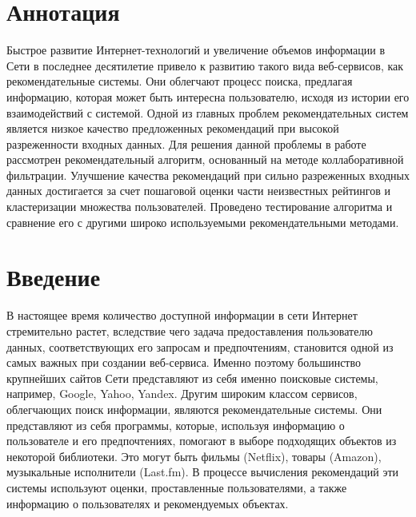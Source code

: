 \documentclass[a4paper, 12pt]{article} %
\begin{document}


\tableofcontents

\newpage
\section{Аннотация}
Быстрое развитие Интернет-технологий и увеличение объемов информации в Сети в последнее десятилетие привело к развитию такого вида веб-сервисов, как рекомендательные системы. Они облегчают процесс поиска, предлагая информацию, которая может быть интересна пользователю, исходя из истории его взаимодействий с системой. Одной из главных проблем рекомендательных систем является низкое качество предложенных рекомендаций при высокой разреженности входных данных. Для решения данной проблемы в работе рассмотрен рекомендательный алгоритм, основанный на методе коллаборативной фильтрации. Улучшение качества рекомендаций при сильно разреженных входных данных достигается за счет пошаговой оценки части неизвестных рейтингов и кластеризации множества пользователей. Проведено тестирование алгоритма и сравнение его с другими широко используемыми рекомендательными методами.

\newpage
\section{Введение}
В настоящее время количество доступной информации в сети Интернет стремительно растет, вследствие чего задача предоставления пользователю данных, соответствующих его запросам и предпочтениям, становится одной из самых важных при создании веб-сервиса. Именно поэтому большинство крупнейших сайтов Сети представляют из себя именно поисковые системы, например, Google, Yahoo, Yandex. Другим широким классом сервисов, облегчающих поиск информации, являются рекомендательные системы. Они представляют из себя программы, которые, используя информацию о пользователе и его предпочтениях, помогают в выборе подходящих объектов из некоторой библиотеки\cite{cfdef}.  Это могут быть фильмы (Netflix), товары (Amazon), музыкальные исполнители (Last.fm). В процессе вычисления рекомендаций эти системы используют оценки, проставленные пользователями, а также информацию о пользователях и рекомендуемых объектах. 
\end{document}
